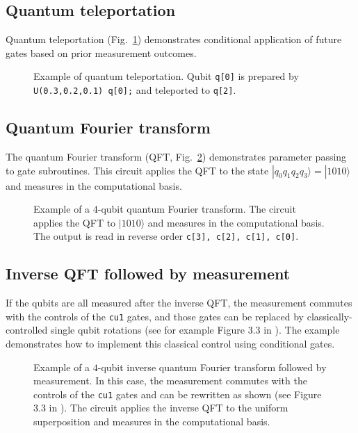 \documentclass[USenglish,12pt,fleqn]{article} %
\newcommand*{\code}{\texttt}
\begin{document}

\subsection{Quantum teleportation}

Quantum teleportation (Fig.~\ref{fig:example:teleport}) demonstrates conditional application of future gates based on prior measurement outcomes.

\begin{figure}
\centering

\caption{Example of quantum teleportation. Qubit \code{q[0]} is prepared by \code{U(0.3,0.2,0.1) q[0];} and teleported to \code{q[2]}.
\label{fig:example:teleport}}
\end{figure}

\subsection{Quantum Fourier transform}
The quantum Fourier transform (QFT, Fig.~\ref{fig:example:qft}) demonstrates parameter passing to gate subroutines. This circuit applies the QFT to the state $|q_0 q_1 q_2 q_3\rangle=|1010\rangle$ and measures in the computational basis.

\begin{figure}
\centering

\caption{Example of a $4$-qubit quantum Fourier transform. The circuit applies the QFT to $|1010\rangle$ and measures in the computational basis. The output is read in reverse order \code{c[3], c[2], c[1], c[0]}. \label{fig:example:qft}}
\end{figure}

\subsection{Inverse QFT followed by measurement}

If the qubits are all measured after the inverse QFT, the measurement commutes with the controls of the \code{cu1} gates, and those gates can be replaced by classically-controlled single qubit rotations (see for example Figure 3.3 in \cite{mermin}). The example demonstrates how to implement this classical control using conditional gates.

\begin{figure}
\hspace{-0.8cm}
\begin{minipage}{.8\textwidth}

\end{minipage}
\caption{Example of a $4$-qubit inverse quantum Fourier transform followed by measurement. In this case, the measurement commutes with the controls of the \code{cu1} gates and can be rewritten as shown (see Figure 3.3 in \cite{mermin}). The circuit applies the inverse QFT to the uniform superposition and measures in the computational basis. 
\label{fig:example:iqft}}
\end{figure}
\end{document}
